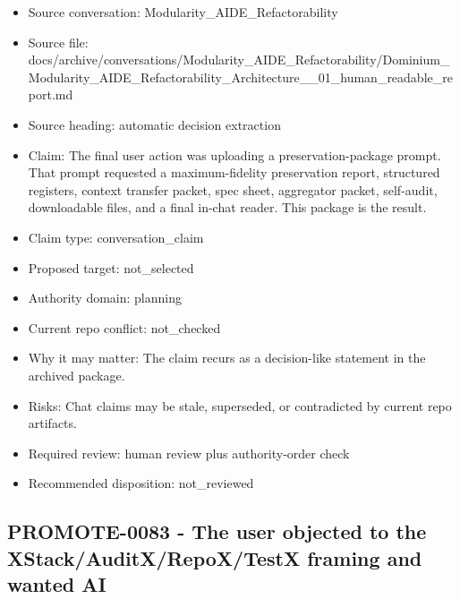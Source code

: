 \documentclass[11pt,a4paper]{report}
\begin{document}
\begin{itemize}
\item Source conversation: Modularity\_AIDE\_Refactorability
\item Source file: docs/archive/conversations/Modularity\_AIDE\_Refactorability/Dominium\_Modularity\_AIDE\_Refactorability\_Architecture\_\_01\_human\_readable\_report.md
\item Source heading: automatic decision extraction
\item Claim: The final user action was uploading a preservation-package prompt. That prompt requested a maximum-fidelity preservation report, structured registers, context transfer packet, spec sheet, aggregator packet, self-audit, downloadable files, and a final in-chat reader. This package is the result.
\item Claim type: conversation\_claim
\item Proposed target: not\_selected
\item Authority domain: planning
\item Current repo conflict: not\_checked
\item Why it may matter: The claim recurs as a decision-like statement in the archived package.
\item Risks: Chat claims may be stale, superseded, or contradicted by current repo artifacts.
\item Required review: human review plus authority-order check
\item Recommended disposition: not\_reviewed
\end{itemize}

\subsection{PROMOTE-0083 - The user objected to the XStack/AuditX/RepoX/TestX framing and wanted AI}
\end{document}
